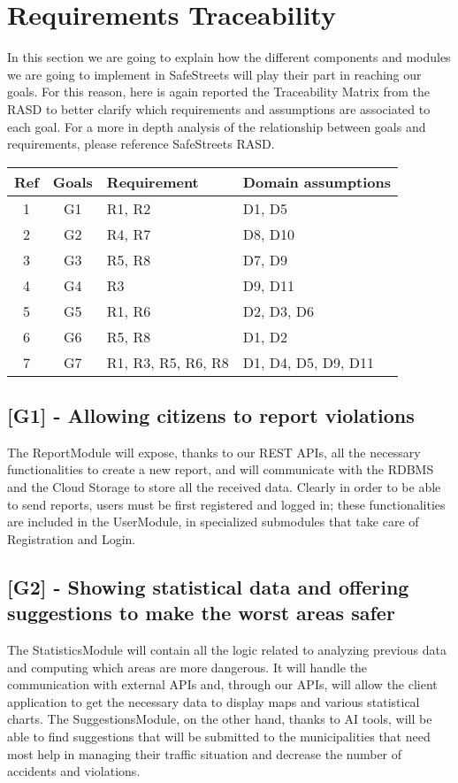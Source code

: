 \section{Requirements Traceability}

In this section we are going to explain how the different components and modules we are going to implement in SafeStreets
will play their part in reaching our goals.
For this reason, here is again reported the Traceability Matrix from the RASD to better clarify which requirements and assumptions are associated to each goal. For a more in depth analysis of the relationship between goals and requirements, please reference SafeStreets RASD.

\begin{center}
  \begin{tabular}{c|c|l|l}
      \hline
      \textbf{Ref} & \textbf{Goals} & \textbf{Requirement} & \textbf{Domain assumptions} \\
      \hline
      1 & G1 & R1, R2 & D1, D5 \\
      \hline
      2 & G2 & R4, R7 & D8, D10 \\
      \hline
      3 & G3 & R5, R8 & D7, D9 \\
      \hline
      4 & G4 & R3 & D9, D11 \\
      \hline
      5 & G5 & R1, R6 & D2, D3, D6 \\
      \hline
      6 & G6 & R5, R8 & D1, D2 \\
      \hline
      7 & G7 & R1, R3, R5, R6, R8 & D1, D4, D5, D9, D11  \\
      \hline
  \end{tabular}
\end{center}

\subsection{[G1] - Allowing citizens to report violations}
The ReportModule will expose, thanks to our REST APIs, all the necessary functionalities to create a new report, and will communicate with the RDBMS and the Cloud Storage to store all the received data.
Clearly in order to be able to send reports, users must be first registered and logged in; these functionalities are included in the UserModule, in specialized submodules that take care of Registration and Login.
\subsection{[G2] - Showing statistical data and offering suggestions to make the worst areas safer}
The StatisticsModule will contain all the logic related to analyzing previous data and computing which areas are more dangerous. It will handle the communication with external APIs and, through our APIs, will allow the client application to get the necessary data to display maps and various statistical charts.
The SuggestionsModule, on the other hand, thanks to AI tools, will be able to find suggestions that will be submitted to the municipalities that need most help in managing their traffic situation and decrease the number of accidents and violations.
